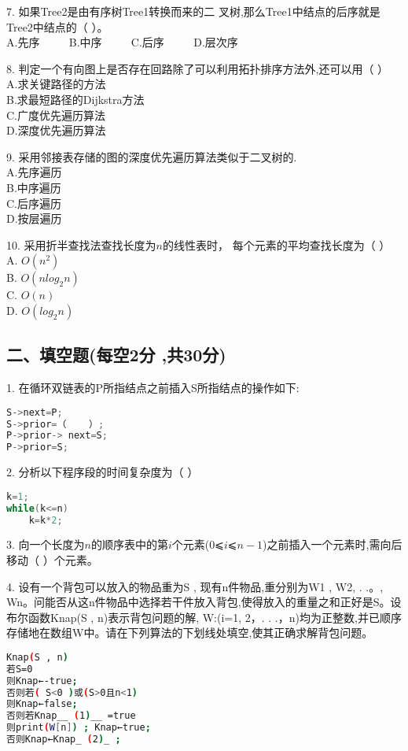 7. 如果Tree2是由有序树Tree1转换而来的二 叉树,那么Tree1中结点的后序就是Tree2中结点的（  ）。 \\
A.先序 $\qquad$ B.中序 $\qquad$ C.后序 $\qquad$ D.层次序

8. 判定一个有向图上是否存在回路除了可以利用拓扑排序方法外,还可以用（    ）  \\
A.求关键路径的方法 \\
B.求最短路径的Dijkstra方法 \\
C.广度优先遍历算法 \\
D.深度优先遍历算法

9. 采用邻接表存储的图的深度优先遍历算法类似于二叉树的. \\
A.先序遍历 \\
B.中序遍历 \\
C.后序遍历 \\
D.按层遍历

10. 采用折半查找法查找长度为$n$的线性表时， 每个元素的平均查找长度为（    ）  \\
A. $O(n^2)$ \\
B. $O(nlog_2n)$ \\
C. $O(n)$ \\
D. $O(log_2n)$

\subsection{二、填空题(每空2分 ,共30分)}

1. 在循环双链表的P所指结点之前插入S所指结点的操作如下: \\
\begin{lstlisting}[language=cpp]
S->next=P;
S->prior=（    ）;
P->prior-> next=S;
P->prior=S;
\end{lstlisting}

2. 分析以下程序段的时间复杂度为（    ）  \\
\begin{lstlisting}[language=cpp]
k=1;
while(k<=n)
    k=k*2;
\end{lstlisting}

3. 向一个长度为$n$的顺序表中的第$i$个元素($0$⩽$i$⩽$n-1$)之前插入一个元素时,需向后移动（    ）个元素。

4. 设有一个背包可以放入的物品重为S , 现有n件物品,重分别为W1 , W2, . .。, Wn。问能否从这n件物品中选择若干件放入背包,使得放入的重量之和正好是S。设布尔函数Knap(S , n)表示背包问题的解, W:(i=1, 2，. . .，n)均为正整数,并已顺序存储地在数组W中。请在下列算法的下划线处填空,使其正确求解背包问题。
\begin{lstlisting}[language=bash]
Knap(S , n)
若S=0
则Knap←-true;
否则若( S<0 )或(S>0且n<1)
则Knap←false;
否则若Knap__ (1)__ =true
则print(W[n]) ; Knap←true;
否则Knap←Knap_ (2)_ ;
\end{lstlisting}


